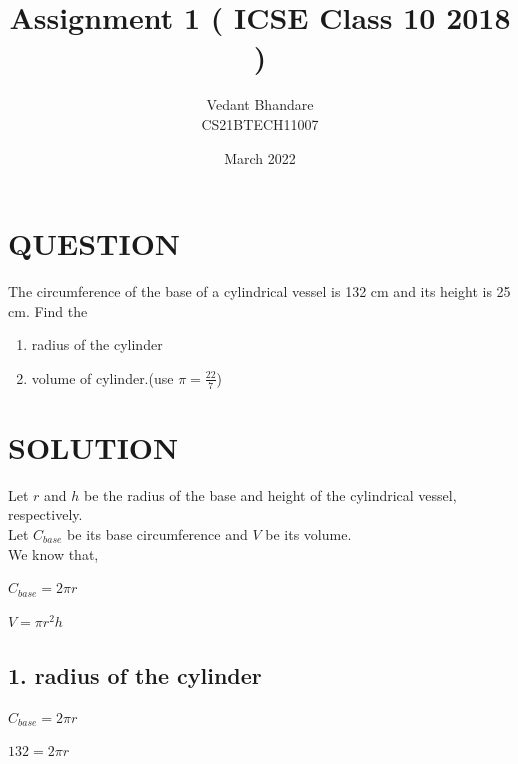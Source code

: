 \documentclass{article}
\title{Assignment 1 ( ICSE Class 10 2018 )}
\author{Vedant Bhandare\\CS21BTECH11007}
\date{March 2022}
\begin{document}
\maketitle

\section*{QUESTION}
The circumference of the base of a cylindrical vessel is 132 cm and its height is 25 cm. Find the

\begin{enumerate}
    \item radius of the cylinder
    \item volume of cylinder.(use $\pi = \frac{22}{7}$)
\end{enumerate}

\section*{SOLUTION}

\vspace{2mm}

Let $r$ and $h$ be the radius of the base and height of the cylindrical vessel, respectively.\\
Let $C_{base}$ be its base circumference and $V$ be its volume.\\

We know that,

\begin{center}
    \large{$C_{base} = 2\pi{r}$}
    
    \vspace{2mm}
    
    $V = \pi{r^2h}$
\end{center}

\vspace{2mm}

\subsection*{1. radius of the cylinder}

\vspace{2mm}

\large{$C_{base} = 2\pi{r}$}

\vspace{1mm}

$132 = 2\pi{r}$

\vspace{1mm}
\end{document}
